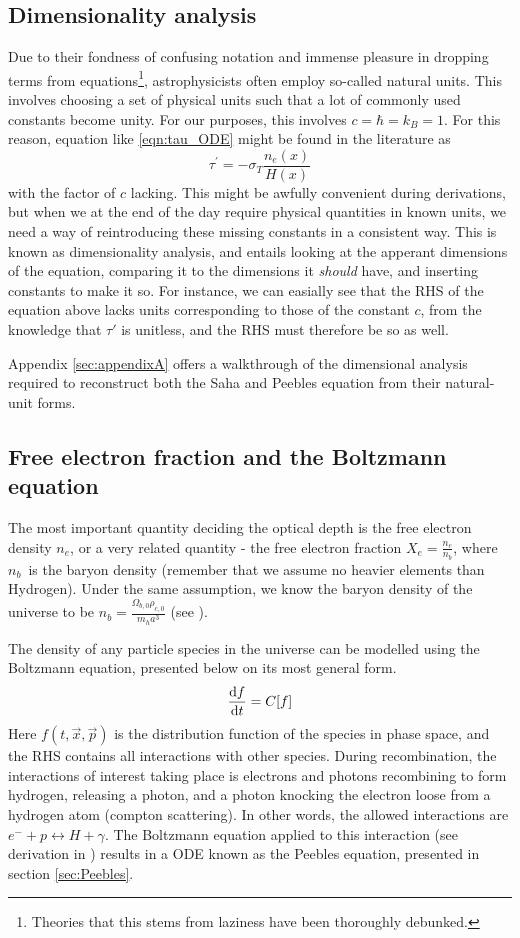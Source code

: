 \documentclass[10pt, a4paper]{article}
\begin{document}
\subsection{Dimensionality analysis}
Due to their fondness of confusing notation and immense pleasure in dropping terms from equations\footnote{Theories that this stems from laziness have been thoroughly debunked.}, astrophysicists often employ so-called natural units. This involves choosing a set of physical units such that a lot of commonly used constants become unity. For our purposes, this involves $c = \hbar = k_B = 1$. For this reason, equation like \ref{eqn:tau_ODE} might be found in the literature as
\begin{equation*}
    \tau^\prime = - \sigma_T\frac{n_{e}(x)}{H(x)}
\end{equation*}
with the factor of $c$ lacking. This might be awfully convenient during derivations, but when we at the end of the day require physical quantities in known units, we need a way of reintroducing these missing constants in a consistent way. This is known as dimensionality analysis, and entails looking at the apperant dimensions of the equation, comparing it to the dimensions it \textit{should} have, and inserting constants to make it so. For instance, we can easially see that the RHS of the equation above lacks units corresponding to those of the constant $c$, from the knowledge that $\tau'$ is unitless, and the RHS must therefore be so as well.

Appendix \ref{sec:appendixA} offers a walkthrough of the dimensional analysis required to reconstruct both the Saha and Peebles equation from their natural-unit forms.


\subsection{Free electron fraction and the Boltzmann equation}
The most important quantity deciding the optical depth is the free electron density $n_e$, or a very related quantity - the free electron fraction $X_e = \frac{n_e}{n_b}$, where $n_b$ is the baryon density (remember that we assume no heavier elements than Hydrogen). Under the same assumption, we know the baryon density of the universe to be $n_b = \frac{\Omega_{b,0}\rho_{c,0}}{m_ha^3}$ (see \cite{Milestone1}).

The density of any particle species in the universe can be modelled using the Boltzmann equation, presented below on its most general form.
\begin{equation*}
    \dv{f}{t} = C[f]
\end{equation*}
Here $f(t, \vec{x}, \vec{p})$ is the distribution function of the species in phase space, and the RHS contains all interactions with other species. During recombination, the interactions of interest taking place is electrons and photons recombining to form hydrogen, releasing a photon, and a photon knocking the electron loose from a hydrogen atom (compton scattering). In other words, the allowed interactions are $e^- + p \leftrightarrow H + \gamma$. The Boltzmann equation applied to this interaction (see derivation in \cite{ModernCosmology2003}) results in a ODE known as the Peebles equation, presented in section \ref{sec:Peebles}. 
\end{document}
